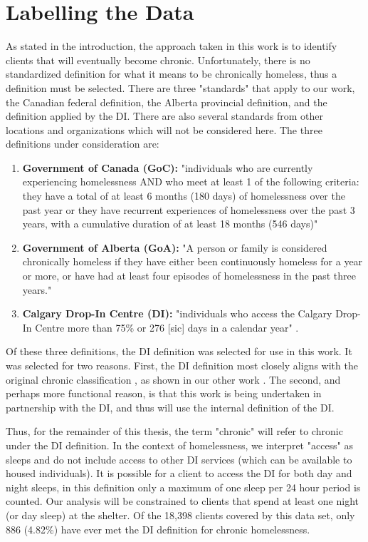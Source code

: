 \section{Labelling the Data} \label{chap:data:labelling}

As stated in the introduction, the approach taken in this work is to identify clients that will eventually become chronic. Unfortunately, there is no standardized definition for what it means to be chronically homeless, thus a definition must be selected. There are three "standards" that apply to our work, the Canadian federal definition, the Alberta provincial definition, and the definition applied by the DI. There are also several standards \cite{byrne2015testing} from other locations and organizations which will not be considered here. The three definitions under consideration are:

\begin{enumerate}
\item \textbf{Government of Canada (GoC):} "individuals who are currently experiencing homelessness AND who meet at least 1 of the following criteria: they have a total of at least 6 months (180 days) of homelessness over the past year or they have recurrent experiences of homelessness over the past 3 years, with a cumulative duration of at least 18 months (546 days)" \cite{canada2020definition}
\item \textbf{Government of Alberta (GoA):} "A person or family is considered chronically homeless if they have either been continuously homeless for a year or more, or have had at least four episodes of homelessness in the past three years." \cite{snyder2008albertadefinition}
\item \textbf{Calgary Drop-In Centre (DI):} "individuals who access the Calgary Drop-In Centre more than 75\% or 276 [sic] days in a calendar year" \cite{di_2019}.
\end{enumerate}

Of these three definitions, the DI definition was selected for use in this work. It was selected for two reasons. First, the DI definition most closely aligns with the original chronic classification \cite{kuhn1998applying}, as shown in our other work \cite{messier2020}. The second, and perhaps more functional reason, is that this work is being undertaken in partnership with the DI, and thus will use the internal definition of the DI.

Thus, for the remainder of this thesis, the term "chronic" will refer to chronic under the DI definition. In the context of homelessness, we interpret "access" as sleeps and do not include access to other DI services (which can be available to housed individuals). It is possible for a client to access the DI for both day and night sleeps, in this definition only a maximum of one sleep per 24 hour period is counted. Our analysis will be constrained to clients that spend at least one night (or day sleep) at the shelter. Of the 18,398 clients covered by this data set, only 886 (4.82\%) have ever met the DI definition for chronic homelessness.


